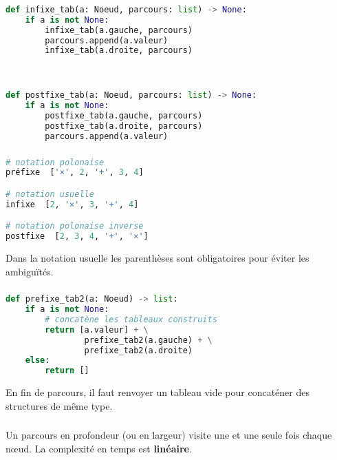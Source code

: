 \documentclass[svgnames,11pt]{beamer}
\begin{document}
\begin{frame}[fragile]
    \frametitle{}

\begin{center}
\begin{lstlisting}[language=Python , basicstyle=\ttfamily\small, xleftmargin=.5em, xrightmargin=0em]
def infixe_tab(a: Noeud, parcours: list) -> None:
    if a is not None:
        infixe_tab(a.gauche, parcours)        
        parcours.append(a.valeur)
        infixe_tab(a.droite, parcours)



def postfixe_tab(a: Noeud, parcours: list) -> None:
    if a is not None:
        postfixe_tab(a.gauche, parcours)        
        postfixe_tab(a.droite, parcours)
        parcours.append(a.valeur)
\end{lstlisting}
\end{center}

\end{frame}
\begin{frame}[fragile]
    \frametitle{}

\begin{center}
\begin{lstlisting}[language=Python , basicstyle=\ttfamily\small, xleftmargin=1em, xrightmargin=1em]
# notation polonaise
préfixe  ['×', 2, '+', 3, 4]

# notation usuelle
infixe  [2, '×', 3, '+', 4]

# notation polonaise inverse
postfixe  [2, 3, 4, '+', '×']
\end{lstlisting}
\end{center}
\begin{aretenir}[Remarque]
Dans la notation usuelle les parenthèses sont obligatoires pour éviter les ambiguïtés.
\end{aretenir}
\end{frame}
\begin{frame}[fragile]
    \frametitle{}

\begin{center}
\begin{lstlisting}[language=Python , basicstyle=\ttfamily\small, xleftmargin=2em, xrightmargin=2em]
def prefixe_tab2(a: Noeud) -> list:
    if a is not None:
        # concatène les tableaux construits
        return [a.valeur] + \
                prefixe_tab2(a.gauche) + \
                prefixe_tab2(a.droite)
    else:
        return []
\end{lstlisting}
\label{CODE}
\end{center}    
\begin{aretenir}[Remarque]
En fin de parcours, il faut renvoyer un tableau vide pour concaténer des structures de même type.
\end{aretenir}
\end{frame}
\begin{frame}
    \frametitle{}

    \begin{aretenir}[]
Un parcours en profondeur (ou en largeur) visite une et une seule fois chaque nœud. La complexité en temps est \textbf{linéaire}.
    \end{aretenir}

\end{frame}
\end{document}
